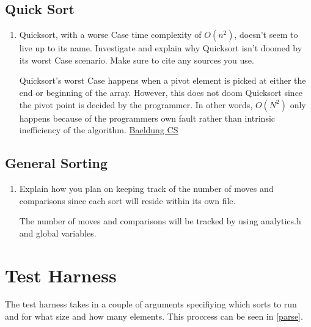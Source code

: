 \documentclass[12pt]{article}
\newenvironment{QandA}{\begin{enumerate}[label=\bfseries\alph*.]\bfseries}
{\end{enumerate}}
\newenvironment{answered}{\par\normalfont}{}
\begin{document}
    \subsection{Quick Sort}
    \begin{QandA}
    \item Quicksort, with a worse Case time complexity of $O(n^2)$, doesn’t seem to live up to its name. Investigate and explain why Quicksort isn’t doomed by its worst Case scenario. Make sure to cite any sources you use.
        \begin{answered}
            Quicksort's worst Case happens when a pivot element is picked at either the end or beginning of the array. However, this does not doom Quicksort since the pivot point is decided by the programmer. In other words, $O(N^2)$ only happens because of the programmers own fault rather than intrinsic inefficiency of the algorithm. \href{https://www.baeldung.com/cs/quicksort-time-complexity-worst-Case}{Baeldung CS}
        \end{answered}


    \end{QandA}

    \subsection{General Sorting}
    \begin{QandA}
    \item Explain how you plan on keeping track of the number of moves and comparisons since each sort will reside within its own file.
        \begin{answered}
            The number of moves and comparisons will be tracked by using analytics.h and global variables.
        \end{answered}


    \end{QandA}


    \section{Test Harness}

    The test harness takes in a couple of arguments specifiying which sorts to run and for what size and how many elements. This proccess can be seen in \vref{parse}.
\end{document}
